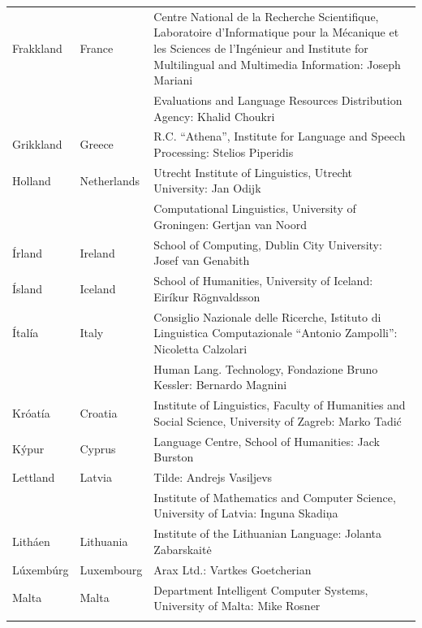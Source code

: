 \documentclass{../../metanetpaper}
\begin{document}
\begin{longtable}{llp{105mm}}
  Frakkland & \textcolor{grey1}{France} & Centre National de la Recherche Scientifique, Laboratoire d'Informatique pour la Mécanique et les Sciences de l'Ingénieur and Institute for Multilingual and Multimedia Information: Joseph Mariani \\ \addlinespace
  & & Evaluations and Language Resources Distribution Agency: Khalid Choukri\\ \addlinespace 
  Grikkland & \textcolor{grey1}{Greece} & R.C. “Athena”, Institute for Language and Speech Processing: Stelios Piperidis\\ \addlinespace 
  Holland & \textcolor{grey1}{Netherlands} & Utrecht Institute of Linguistics, Utrecht University: Jan Odijk\\ \addlinespace 
  & & Computational Linguistics, University of Groningen: Gertjan van Noord\\ \addlinespace
  Írland & \textcolor{grey1}{Ireland} & School of Computing, Dublin City University: Josef van Genabith\\ \addlinespace
  Ísland & \textcolor{grey1}{Iceland} & School of Humanities, University of Iceland: Eiríkur Rögnvaldsson\\ \addlinespace
  Ítalía & \textcolor{grey1}{Italy} & Consiglio Nazionale delle Ricerche, Istituto di Linguistica Computazionale “Antonio Zampolli”: Nicoletta Calzolari\\ \addlinespace
  & & Human Lang. Technology, Fondazione Bruno Kessler: Bernardo Magnini\\ \addlinespace 
  Króatía & \textcolor{grey1}{Croatia} & Institute of Linguistics, Faculty of Humanities and Social Science, University of Zagreb: Marko Tadić \\ \addlinespace
  Kýpur & \textcolor{grey1}{Cyprus} & Language Centre, School of Humanities: Jack Burston\\ \addlinespace 
  Lettland & \textcolor{grey1}{Latvia} & Tilde: Andrejs Vasiļjevs\\ \addlinespace 
  & & Institute of Mathematics and Computer Science, University of Latvia: Inguna Skadiņa\\ \addlinespace
  Litháen & \textcolor{grey1}{Lithuania} & Institute of the Lithuanian Language: Jolanta Zabarskaitė\\ \addlinespace
  Lúxembúrg & \textcolor{grey1}{Luxembourg} & Arax Ltd.: Vartkes Goetcherian\\ \addlinespace
  Malta & \textcolor{grey1}{Malta} & Department Intelligent Computer Systems, University of Malta: Mike Rosner\\ \addlinespace

\end{longtable}
\end{document}
